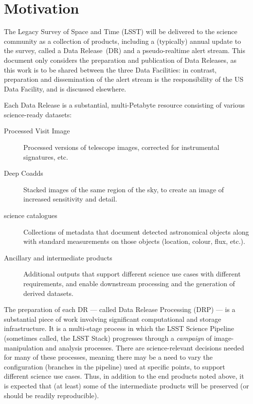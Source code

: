 \section{Motivation}

The Legacy Survey of Space and Time (LSST) will be delivered to the science community as a collection of products, including a (typically) annual update to the survey, called a Data Release~(DR) and a pseudo-realtime alert stream. This document only considers the preparation and publication of Data Releases, as this work is to be shared between the three Data Facilities: in contrast, preparation and dissemination of the alert stream is the responsibility of the US Data Facility, and is discussed elsewhere.

Each Data Release is a substantial, multi-Petabyte resource consisting of various science-ready datasets:

\begin{description}

\item[Processed Visit Image] Processed versions of telescope images, corrected for instrumental signatures, etc.

\item[Deep Coadds] Stacked images of the same region of the sky, to create an image of increased sensitivity and detail.

\item[science catalogues] Collections of metadata that document detected astronomical objects along with standard measurements on those objects (location, colour, flux, etc.).

\item[Ancillary and intermediate products] Additional outputs that support different science use cases with different requirements, and enable downstream processing and the generation of derived datasets.

\end{description}

The preparation of each DR --- called Data Release Processing (DRP) --- is a substantial piece of work involving significant computational and storage infrastructure. It is a multi-stage process in which the LSST Science Pipeline (sometimes called, the LSST Stack) progresses through a {\em campaign} of image-manipulation and analysis processes. There are science-relevant decisions needed for many of these processes, meaning there may be a need to vary the configuration (branches in the pipeline) used at specific points, to support different science use cases. Thus, in addition to the end products noted above, it is expected that (at least) some of the intermediate products will be preserved (or should be readily reproducible).

